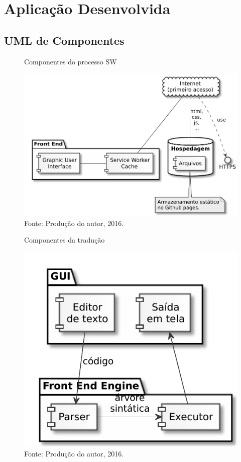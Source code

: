 \chapter{Aplicação Desenvolvida}

\section{UML de Componentes}

\begin{figure}[h]
  \caption{Componentes do processo SW}\label{fig:componentssw}
  \centering
\includegraphics[keepaspectratio]{figures/components-sw.pdf}
  \caption*{\footnotesize Fonte: Produção do autor, 2016.}
\end{figure}

\begin{figure}[h]
  \caption{Componentes da tradução}\label{fig:componentsrun}
  \centering
\includegraphics[keepaspectratio]{figures/components-run.pdf}
  \caption*{\footnotesize Fonte: Produção do autor, 2016.}
\end{figure}

